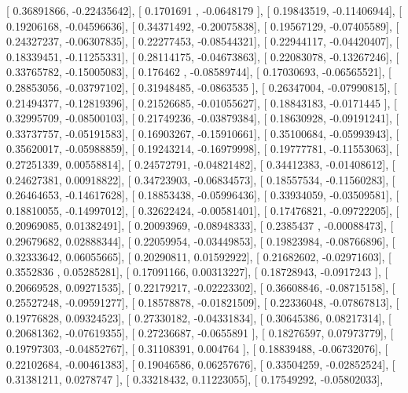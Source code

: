 \documentclass{article}
\begin{document}
       [ 0.36891866, -0.22435642],
       [ 0.1701691 , -0.0648179 ],
       [ 0.19843519, -0.11406944],
       [ 0.19206168, -0.04596636],
       [ 0.34371492, -0.20075838],
       [ 0.19567129, -0.07405589],
       [ 0.24327237, -0.06307835],
       [ 0.22277453, -0.08544321],
       [ 0.22944117, -0.04420407],
       [ 0.18339451, -0.11255331],
       [ 0.28114175, -0.04673863],
       [ 0.22083078, -0.13267246],
       [ 0.33765782, -0.15005083],
       [ 0.176462  , -0.08589744],
       [ 0.17030693, -0.06565521],
       [ 0.28853056, -0.03797102],
       [ 0.31948485, -0.0863535 ],
       [ 0.26347004, -0.07990815],
       [ 0.21494377, -0.12819396],
       [ 0.21526685, -0.01055627],
       [ 0.18843183, -0.0171445 ],
       [ 0.32995709, -0.08500103],
       [ 0.21749236, -0.03879384],
       [ 0.18630928, -0.09191241],
       [ 0.33737757, -0.05191583],
       [ 0.16903267, -0.15910661],
       [ 0.35100684, -0.05993943],
       [ 0.35620017, -0.05988859],
       [ 0.19243214, -0.16979998],
       [ 0.19777781, -0.11553063],
       [ 0.27251339,  0.00558814],
       [ 0.24572791, -0.04821482],
       [ 0.34412383, -0.01408612],
       [ 0.24627381,  0.00918822],
       [ 0.34723903, -0.06834573],
       [ 0.18557534, -0.11560283],
       [ 0.26464653, -0.14617628],
       [ 0.18853438, -0.05996436],
       [ 0.33934059, -0.03509581],
       [ 0.18810055, -0.14997012],
       [ 0.32622424, -0.00581401],
       [ 0.17476821, -0.09722205],
       [ 0.20969085,  0.01382491],
       [ 0.20093969, -0.08948333],
       [ 0.2385437 , -0.00088473],
       [ 0.29679682,  0.02888344],
       [ 0.22059954, -0.03449853],
       [ 0.19823984, -0.08766896],
       [ 0.32333642,  0.06055665],
       [ 0.20290811,  0.01592922],
       [ 0.21682602, -0.02971603],
       [ 0.3552836 ,  0.05285281],
       [ 0.17091166,  0.00313227],
       [ 0.18728943, -0.0917243 ],
       [ 0.20669528,  0.09271535],
       [ 0.22179217, -0.02223302],
       [ 0.36608846, -0.08715158],
       [ 0.25527248, -0.09591277],
       [ 0.18578878, -0.01821509],
       [ 0.22336048, -0.07867813],
       [ 0.19776828,  0.09324523],
       [ 0.27330182, -0.04331834],
       [ 0.30645386,  0.08217314],
       [ 0.20681362, -0.07619355],
       [ 0.27236687, -0.0655891 ],
       [ 0.18276597,  0.07973779],
       [ 0.19797303, -0.04852767],
       [ 0.31108391,  0.004764  ],
       [ 0.18839488, -0.06732076],
       [ 0.22102684, -0.00461383],
       [ 0.19046586,  0.06257676],
       [ 0.33504259, -0.02852524],
       [ 0.31381211,  0.0278747 ],
       [ 0.33218432,  0.11223055],
       [ 0.17549292, -0.05802033],
\end{document}
